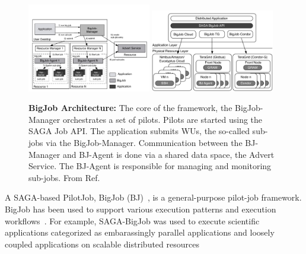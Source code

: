 \documentclass[]{svjour3}
\begin{document}
\begin{figure}[t]
  \centering
   \includegraphics[width=0.48\textwidth]{figures/re_bigjob_interactions.pdf}
  \includegraphics[width=0.48\textwidth]{figures/distributed_pilot_job.pdf}

        \caption{\textbf{BigJob Architecture:} The core of the
          framework, the BigJob-Manager orchestrates a set of
          pilots. Pilots are started using the SAGA Job API. The
          application submits WUs, the so-called sub-jobs via the
          BigJob-Manager. Communication between the BJ-Manager and
          BJ-Agent is done via a shared data space, the Advert
          Service. The BJ-Agent is responsible for managing and
          monitoring sub-jobs. From
          Ref.~\cite{saga_bigjob_condor_cloud}}
        \label{fig:figures_re_bigjob_interactions}
\end{figure}


A SAGA-based PilotJob, BigJob (BJ)~\cite{bigjob_web,saga_bigjob_condor_cloud}, is a
general-purpose pilot-job framework. BigJob has been used to support various
execution patterns and execution workflows~\cite{async_repex11,saga-royalsoc}.
For example, SAGA-BigJob was used to execute scientific
applications categorized as embarassingly parallel applications and
loosely coupled applications on scalable distributed
resources~\cite{ecmls_ccpe10, dare-ecmls11}
\end{document}
